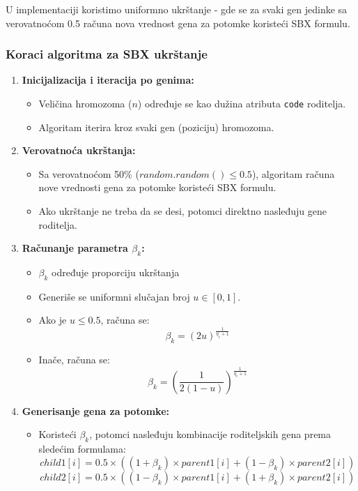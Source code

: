 \documentclass[12pt]{article}
\begin{document}
U implementaciji koristimo uniformno ukrštanje - gde se za svaki gen jedinke sa verovatnoćom 0.5 računa nova vrednost gena za potomke koristeći SBX formulu.

\subsubsection*{Koraci algoritma za SBX ukrštanje}
\begin{enumerate}
    \item \textbf{Inicijalizacija i iteracija po genima:}
    \begin{itemize}
        \item Veličina hromozoma ($n$) određuje se kao dužina atributa \texttt{code} roditelja.
        \item Algoritam iterira kroz svaki gen (poziciju) hromozoma.
    \end{itemize}
    
    \item \textbf{Verovatnoća ukrštanja:}
    \begin{itemize}
        \item Sa verovatnoćom 50\% ($random.random() \leq 0.5$), algoritam računa nove vrednosti gena za potomke koristeći SBX formulu.
        \item Ako ukrštanje ne treba da se desi, potomci direktno nasleđuju gene roditelja.
    \end{itemize}
    
    \item \textbf{Računanje parametra $\beta_k$:}
    \begin{itemize}
    	\item $\beta_k$ određuje proporciju ukrštanja
        \item Generiše se uniformni slučajan broj $u \in [0,1]$.
        \item Ako je $u \leq 0.5$, računa se:
        \[
        \beta_k = (2u)^{\frac{1}{\eta_c + 1}}
        \]
        \item Inače, računa se:
        \[
        \beta_k = \left(\frac{1}{2(1-u)}\right)^{\frac{1}{\eta_c + 1}}
        \]
    \end{itemize}
    
    \item \textbf{Generisanje gena za potomke:}
    \begin{itemize}
        \item Koristeći $\beta_k$, potomci nasleđuju kombinacije roditeljskih gena prema sledećim formulama:
        \[
        child1[i] = 0.5 \times ((1 + \beta_k) \times parent1[i] + (1 - \beta_k) \times parent2[i])
        \]
        \[
        child2[i] = 0.5 \times ((1 - \beta_k) \times parent1[i] + (1 + \beta_k) \times parent2[i])
        \]
    \end{itemize}
    

\end{enumerate}
\end{document}
